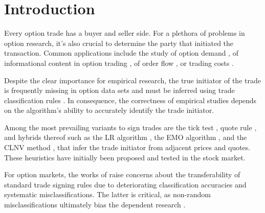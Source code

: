 \section{Introduction}\label{sec:introduction}

Every option trade has a buyer and seller side. For a plethora of problems in option research, it’s also crucial to determine the party that initiated the transaction. Common applications include the study of option demand \autocite[\checkmark][4261]{garleanuDemandBasedOptionPricing2009}, of informational content in option trading \autocites[\checkmark][631]{huDoesOptionTrading2014}[\checkmark][882]{panInformationOptionVolume2006}[\checkmark][1079]{caoInformationalContentOption2005}, of order flow \autocite[\checkmark][684]{muravyevOrderFlowExpected2016}, or trading costs \autocite[\checkmark][4980]{muravyevOptionsTradingCosts2020}. 

Despite the clear importance for empirical research, the true initiator of the trade is frequently missing in option data sets and must be inferred using trade classification rules \autocite[\checkmark][453]{easleyOptionVolumeStock1998}. In consequence, the correctness of empirical studies depends on the algorithm's ability to accurately identify the trade initiator.

Among the most prevailing variants to sign trades are the tick test \autocite[\checkmark][240]{hasbrouckTradesQuotesInventories1988}, quote rule \autocite[\checkmark][41]{harrisDayEndTransactionPrice1989}, and hybrids thereof such as the \gls{LR} algorithm \autocite[\checkmark][745]{leeInferringTradeDirection1991}, the \gls{EMO} algorithm \autocite[\checkmark][536]{ellisAccuracyTradeClassification2000}, and the \gls{CLNV} method \autocite[\checkmark][3812]{chakrabartyTradeClassificationAlgorithms2007}, that infer the trade initiator from adjacent prices and quotes. These heuristics have initially been proposed and tested in the stock market.

For option markets, the works of \textcites[\checkmark][11--13]{grauerOptionTradeClassification2022}[\checkmark][887--891]{savickasInferringDirectionOption2003} raise concerns about the transferability of standard trade signing rules due to deteriorating classification accuracies and systematic misclassifications. The latter is critical, as non-random misclassifications ultimately bias the dependent research \autocites[\checkmark][260]{odders-whiteOccurrenceConsequencesInaccurate2000}[\checkmark][157]{theissenTestAccuracyLee2001}.

